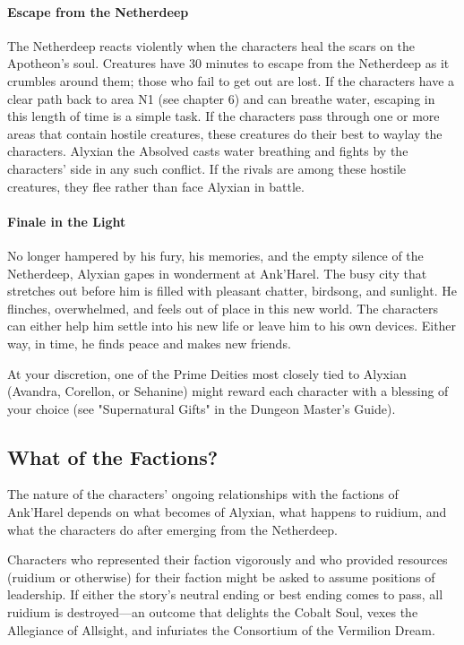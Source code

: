 \documentclass[10pt,a4paper,twoside,bg=print,twocolumn,openany,nodeprecatedcode]{dndbook}
\begin{document}
\paragraph{Escape from the Netherdeep}
The Netherdeep reacts violently when the characters heal the scars on the Apotheon's soul. Creatures have 30 minutes to escape from the Netherdeep as it crumbles around them; those who fail to get out are lost. If the characters have a clear path back to area N1 (see chapter 6) and can breathe water, escaping in this length of time is a simple task. If the characters pass through one or more areas that contain hostile creatures, these creatures do their best to waylay the characters. Alyxian the Absolved casts water breathing and fights by the characters' side in any such conflict. If the rivals are among these hostile creatures, they flee rather than face Alyxian in battle.

\paragraph{Finale in the Light}
No longer hampered by his fury, his memories, and the empty silence of the Netherdeep, Alyxian gapes in wonderment at Ank'Harel. The busy city that stretches out before him is filled with pleasant chatter, birdsong, and sunlight. He flinches, overwhelmed, and feels out of place in this new world. The characters can either help him settle into his new life or leave him to his own devices. Either way, in time, he finds peace and makes new friends.

At your discretion, one of the Prime Deities most closely tied to Alyxian (Avandra, Corellon, or Sehanine) might reward each character with a blessing of your choice (see "Supernatural Gifts" in the Dungeon Master's Guide).

\subsection{What of the Factions?}
The nature of the characters' ongoing relationships with the factions of Ank'Harel depends on what becomes of Alyxian, what happens to ruidium, and what the characters do after emerging from the Netherdeep.

Characters who represented their faction vigorously and who provided resources (ruidium or otherwise) for their faction might be asked to assume positions of leadership. If either the story's neutral ending or best ending comes to pass, all ruidium is destroyed—an outcome that delights the Cobalt Soul, vexes the Allegiance of Allsight, and infuriates the Consortium of the Vermilion Dream.
\end{document}

